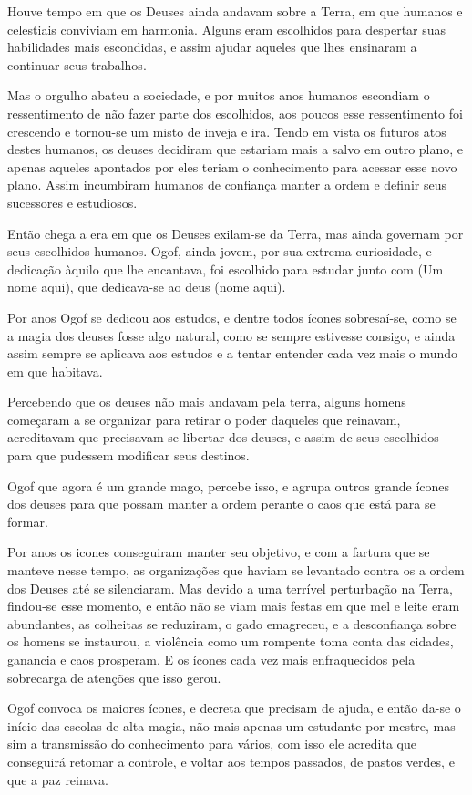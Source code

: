Houve tempo em que os Deuses ainda andavam sobre a Terra, em que humanos e celestiais conviviam em harmonia. Alguns eram escolhidos para despertar suas habilidades mais escondidas, e assim ajudar aqueles que lhes ensinaram a continuar seus trabalhos. 

Mas o orgulho abateu a sociedade, e por muitos anos humanos escondiam o ressentimento de não fazer parte dos escolhidos, aos poucos esse ressentimento foi crescendo e tornou-se um misto de inveja e ira. Tendo em vista os futuros atos destes humanos, os deuses decidiram que estariam mais a salvo em outro plano, e apenas aqueles apontados por eles teriam o conhecimento para acessar esse novo plano. Assim incumbiram humanos de confiança manter a ordem e definir seus sucessores e estudiosos. 

Então chega a era em que os Deuses exilam-se da Terra, mas ainda governam por seus escolhidos humanos. Ogof, ainda jovem, por sua extrema curiosidade, e dedicação àquilo que lhe encantava, foi escolhido para estudar junto com (Um nome aqui), que dedicava-se ao deus (nome aqui). 

Por anos Ogof se dedicou aos estudos, e dentre todos ícones sobresaí-se, como se a magia dos deuses fosse algo natural, como se sempre estivesse consigo, e ainda assim sempre se aplicava aos estudos e a tentar entender cada vez mais o mundo em que habitava.

Percebendo que os deuses não mais andavam pela terra, alguns homens começaram a se organizar para retirar o poder daqueles que reinavam, acreditavam que precisavam se libertar dos deuses, e assim de seus escolhidos para que pudessem modificar seus destinos.

Ogof que agora é um grande mago, percebe isso, e agrupa outros grande ícones dos deuses para que possam manter a ordem perante o caos que está para se formar.

Por anos os icones conseguiram manter seu objetivo, e com a fartura que se manteve nesse tempo, as organizações que haviam se levantado contra os a ordem dos Deuses até se silenciaram. Mas devido a uma terrível perturbação na Terra, findou-se esse momento, e então não se viam mais festas em que mel e leite eram abundantes, as colheitas se reduziram, o gado emagreceu, e a desconfiança sobre os homens se instaurou, a violência como um rompente toma conta das cidades, ganancia e caos prosperam. E os ícones cada vez mais enfraquecidos pela sobrecarga de atenções que isso gerou.

Ogof convoca os maiores ícones, e decreta que precisam de ajuda, e então da-se o início das escolas de alta magia, não mais apenas um estudante por mestre, mas sim a transmissão do conhecimento para vários, com isso ele acredita que conseguirá retomar a controle, e voltar aos tempos passados, de pastos verdes, e que a paz reinava.

